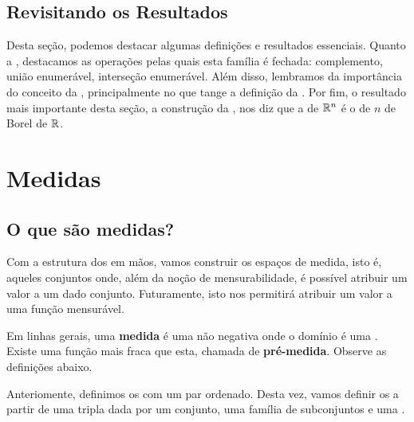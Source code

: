 \productSigmaAlgebraOfRn

\subsection*{Revisitando os Resultados}
Desta seção, podemos destacar algumas definições e resultados essenciais. Quanto a , destacamos as operações pelas quais esta família é fechada: complemento, união enumerável, interseção enumerável. Além disso, lembramos da importância do conceito da , principalmente no que tange a definição da . Por fim, o resultado mais importante desta seção, a construção da , nos diz que a  de $\mathbb{R}^n$ é o  de $n$ \sigmaAlgs de Borel de $\mathbb{R}$.














\section{Medidas}

\subsection{O que são medidas?}
Com a estrutura dos  em mãos, vamos construir os espaços de medida, isto é, aqueles conjuntos onde, além da noção de mensurabilidade, é possível atribuir um valor a um dado conjunto. Futuramente, isto nos permitirá atribuir um valor a uma função mensurável.

Em linhas gerais, uma \textbf{medida} é uma  não negativa onde o domínio é uma . Existe uma função mais fraca que esta, chamada de \textbf{pré-medida}. Observe as definições abaixo.

\preMeasure
\measure

Anteriomente, definimos os  com um par ordenado. Desta vez, vamos definir os  a partir de uma tripla dada por um conjunto, uma família de subconjuntos e uma .

